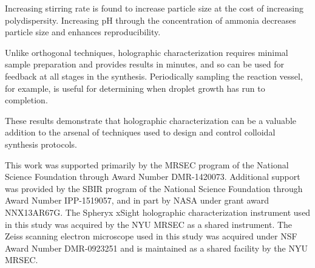 \documentclass[journal=langd5,manuscript=article]{achemso}
\providecommand{\DIFdelbegin}{} %
\providecommand{\DIFdelend}{} %
\begin{document}
Increasing stirring rate is found to increase particle
size at the cost of increasing polydispersity.
Increasing pH through the concentration of ammonia 
decreases particle size and enhances 
reproducibility.

Unlike orthogonal techniques, holographic characterization requires minimal
sample preparation and provides results in minutes,
and so can be used for feedback at all stages in
the synthesis.
Periodically sampling the reaction vessel, for example, 
is useful for determining when droplet growth has
run to completion.

These results demonstrate that holographic characterization can be a valuable
addition to the arsenal of techniques used to design and control colloidal
synthesis protocols.

\begin{acknowledgement}
\DIFdelbegin %

\DIFdelend This work was supported primarily by the MRSEC program of
the National Science Foundation through Award Number DMR-1420073.
Additional support was provided by the SBIR program of the
National Science Foundation through Award Number IPP-1519057, and in part by
NASA under grant award NNX13AR67G.
The Spheryx xSight holographic characterization instrument
used in this study was acquired by the NYU MRSEC as a shared
instrument.
The Zeiss scanning electron microscope used in this study
was acquired under
NSF Award Number DMR-0923251 and is maintained as a shared
facility by the NYU MRSEC.

\end{acknowledgement}

%
%
\end{document}
